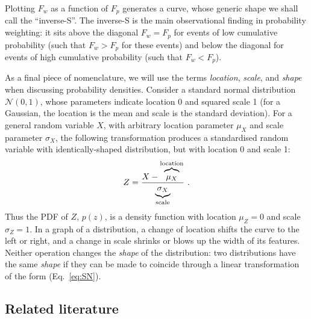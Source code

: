 \documentclass[a4paper, 12pt]{article}
\newcommand{\elabel}[1]{\label{eq:#1}}
\newcommand{\eref}[1]{(Eq.~\ref{eq:#1})}
\newcommand{\be}{\begin{equation}}
\newcommand{\ee}{\end{equation}}
\newcommand{\ND}{\mathcal{N}} %
\begin{document}
Plotting $F_w$ as a function of $F_p$ generates a curve, whose generic shape we shall call the ``inverse-S''. The inverse-S is the main observational finding in probability weighting: it sits above the diagonal $F_w=F_p$ for events of low cumulative probability (such that $F_w>F_p$ for these events) and below the diagonal for events of high cumulative probability (such that $F_w<F_p$).

As a final piece of nomenclature, we will use the terms \textit{location}, \textit{scale}, and \textit{shape} when discussing probability densities. Consider a standard normal distribution $\ND(0,1)$, whose parameters indicate location 0 and squared scale 1 (for a Gaussian, the location is the mean and scale is the standard deviation). For a general random variable $X$, with arbitrary location parameter $\mu_X$ and scale parameter $\sigma_X$, the following transformation produces a standardised random variable with identically-shaped distribution, but with location 0 and scale 1:
%
\be
Z = \frac{X-\overbrace{\mu_X \mathstrut}^{\text{location}}}{\underbrace{\sigma_X\mathstrut}_{\text{scale}}}~.
\elabel{SN}
\ee
%
Thus the PDF of $Z$, $p(z)$, is a density function with location $\mu_Z=0$ and scale $\sigma_Z=1$. In a graph of a distribution, a change of location shifts the curve to the left or right, and a change in scale shrinks or blows up the width of its features. Neither operation changes the \textit{shape} of the distribution: two distributions have the same \textit{shape} if they can be made to coincide through a linear transformation of the form \eref{SN}.

\subsection{Related literature}
\end{document}

